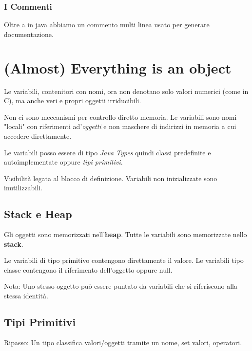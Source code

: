 \subsubsection{I Commenti}
Oltre a  in java abbiamo  un commento multi linea usato per generare documentazione.


\section{(Almost) Everything is an object}
Le variabili, contenitori con nomi, ora non denotano solo valori numerici (come in C), ma anche veri e propri oggetti irriducibili.

Non ci sono meccanismi per controllo diretto memoria. Le variabili sono nomi "locali" con riferimenti ad'\textit{oggetti} e non maschere di indirizzi in memoria a cui accedere direttamente.

Le variabili posso essere di tipo \textit{Java Types} quindi classi predefinite e autoimplementate oppure \textit{tipi primitivi}.

Visibilità legata al blocco di definizione.
Variabili non inizializzate sono inutilizzabili.

\subsection{Stack e Heap}
Gli oggetti sono memorizzati nell'\textbf{heap}. Tutte le variabili sono memorizzate nello \textbf{stack}.

Le variabili di tipo primitivo contengono direttamente il valore. Le variabili tipo classe contengono il riferimento dell'oggetto oppure null.

Nota: Uno stesso oggetto può essere puntato da variabili che si riferiscono alla stessa identità.

\subsection{Tipi Primitivi}
Ripasso: Un tipo classifica valori/oggetti tramite un nome, set valori, operatori.

